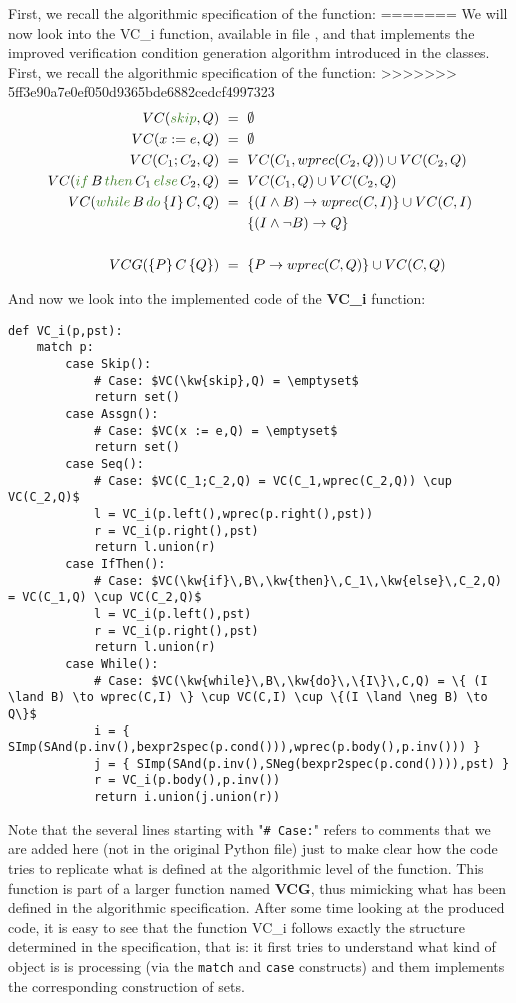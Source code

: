 \documentclass[11pt]{article}
\newcommand{\kw}[1]{{\color{OliveGreen}{#1}}}
\begin{document}
First, we recall the algorithmic specification of the function:
=======
We will now look into the VC\_i function, available in file , and that implements the improved verification condition generation algorithm introduced in the classes. First, we recall the algorithmic specification of the function:
>>>>>>> 5ff3e90a7e0ef050d9365bde6882cedcf4997323
\begin{align*}
VC(\kw{skip},Q) & ~=~ \emptyset\\
VC(x := e,Q)    & ~=~ \emptyset\\
VC(C_1;C_2,Q)   & ~=~ VC(C_1,wprec(C_2,Q)) \cup VC(C_2,Q)\\
VC(\kw{if}\,B\,\kw{then}\,C_1\,\kw{else}\,C_2,Q) & ~=~ VC(C_1,Q) \cup VC(C_2,Q)\\
VC(\kw{while}\,B\,\kw{do}\,\{I\}\,C,Q) & ~=~ \{ (I \land B) \to wprec(C,I) \} \cup VC(C,I)\\
& \:\:\:\:\:\:\:\:\:\{(I \land \neg B) \to Q\}\\
& \\
VCG(\{P\}\,C\,\{Q\}) & ~=~ \{P \to wprec(C,Q)\} \cup VC(C,Q)
\end{align*}

And now we look into the implemented code of the \textbf{VC\_i} function:
\begin{lstlisting}[style=Python]
def VC_i(p,pst):
    match p:
        case Skip():
            # Case: $VC(\kw{skip},Q) = \emptyset$
            return set()
        case Assgn():
            # Case: $VC(x := e,Q) = \emptyset$
            return set()
        case Seq():
            # Case: $VC(C_1;C_2,Q) = VC(C_1,wprec(C_2,Q)) \cup VC(C_2,Q)$ 
            l = VC_i(p.left(),wprec(p.right(),pst))
            r = VC_i(p.right(),pst)
            return l.union(r)
        case IfThen():
            # Case: $VC(\kw{if}\,B\,\kw{then}\,C_1\,\kw{else}\,C_2,Q) = VC(C_1,Q) \cup VC(C_2,Q)$
            l = VC_i(p.left(),pst)
            r = VC_i(p.right(),pst)
            return l.union(r)
        case While():
            # Case: $VC(\kw{while}\,B\,\kw{do}\,\{I\}\,C,Q) = \{ (I \land B) \to wprec(C,I) \} \cup VC(C,I) \cup \{(I \land \neg B) \to Q\}$
            i = { SImp(SAnd(p.inv(),bexpr2spec(p.cond())),wprec(p.body(),p.inv())) }
            j = { SImp(SAnd(p.inv(),SNeg(bexpr2spec(p.cond()))),pst) }
            r = VC_i(p.body(),p.inv())
            return i.union(j.union(r))  
\end{lstlisting}

Note that the several lines starting with "\lstinline!# Case:!" refers to comments that we are added here (not in the original Python file) just to make clear how the code tries to replicate what is defined at the algorithmic level of the function. This function is part of a larger function named \textbf{VCG}, thus mimicking what has been defined in the algorithmic specification. After some time looking at the produced code, it is easy to see that the function VC\_i follows exactly the structure determined in the specification, that is: it first tries to understand what kind of object is is processing (via the \lstinline!match! and \lstinline!case! constructs) and them implements the corresponding construction of sets.
\end{document}
